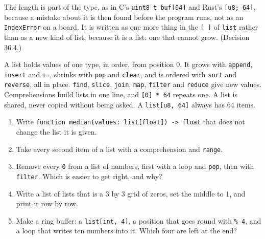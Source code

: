 \begin{why}
The length is part of the type, as in C's \verb|uint8_t buf[64]| and
Rust's \verb|[u8; 64]|, because a mistake about it is then found
before the program runs, not as an \verb|IndexError| on a board. It is
written as one more thing in the \verb|[ ]| of \verb|list| rather
than as a new kind of list, because it is a list: one that cannot
grow. (Decision 36.4.)
\end{why}

\begin{summary}
A list holds values of one type, in order, from position 0. It grows
with \verb|append|, \verb|insert| and \verb|+=|, shrinks with
\verb|pop| and \verb|clear|, and is ordered with \verb|sort| and
\verb|reverse|, all in place. \verb|find|, \verb|slice|, \verb|join|,
\verb|map|, \verb|filter| and \verb|reduce| give new values.
Comprehensions build lists in one line, and \verb|[0] * 64| repeats
one. A list is shared, never copied without being asked. A
\verb|list[u8, 64]| always has 64 items.
\end{summary}

\begin{tryit}
\begin{enumerate}
\item Write \verb|function median(values: list[float]) -> float| that
  does not change the list it is given.
\item Take every second item of a list with a comprehension and
  \verb|range|.
\item Remove every \verb|0| from a list of numbers, first with a loop
  and \verb|pop|, then with \verb|filter|. Which is easier to get
  right, and why?
\item Write a list of lists that is a 3 by 3 grid of zeros, set the
  middle to 1, and print it row by row.
\item Make a ring buffer: a \verb|list[int, 4]|, a position that goes
  round with \verb|% 4|, and a loop that writes ten numbers into it.
  Which four are left at the end?
\end{enumerate}
\end{tryit}
